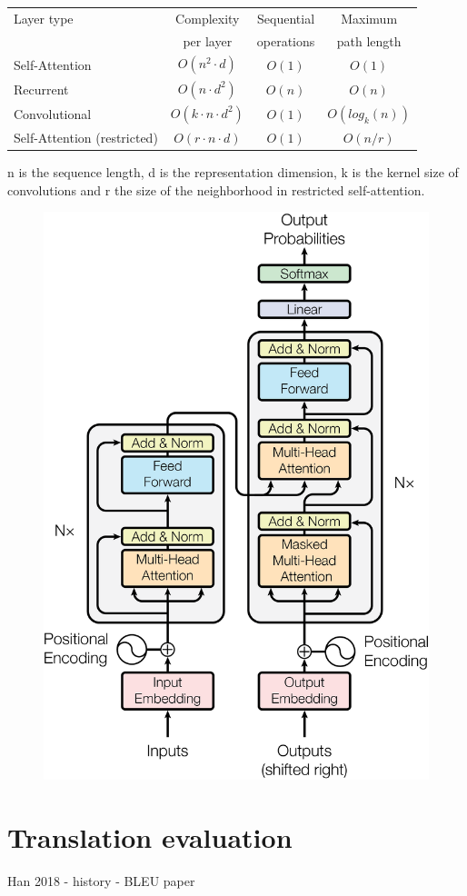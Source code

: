 \begin{table}
\centering
\begin{tabular}{l|ccc}
\toprule
Layer type        &   Complexity             &  Sequential & Maximum        \\
                  &   per layer              &  operations & path length    \\
\midrule
Self-Attention    & $O(n^2 \cdot d)$         & $O(1)$      & $O(1)$         \\
Recurrent         & $O(n \cdot d^2)$         & $O(n)$      & $O(n)$         \\
Convolutional     & $O(k \cdot n \cdot d^2)$ & $O(1)$      & $O(log_k (n))$ \\
Self-Attention (restricted) & $O(r \cdot n \cdot d)$       & $O(1)$ & $O(n/r)$  \\
\bottomrule
\end{tabular}
 {
	n is the sequence length, 
	d is the representation dimension, 
	k is the kernel size of convolutions and 
	r the size of the neighborhood in restricted self-attention.
}
\label{tab:layer_complexity_comp}
\end{table}


\begin{figure}[h]
	\centering
	\includegraphics[width=0.9\columnwidth]{../img/transformer_architecture.png}
	 {}
	\label{fig:transformer_architecture}
\end{figure}

\section{Translation evaluation}

Han 2018 - history 
\cite{Papineni02bleu} - BLEU paper
